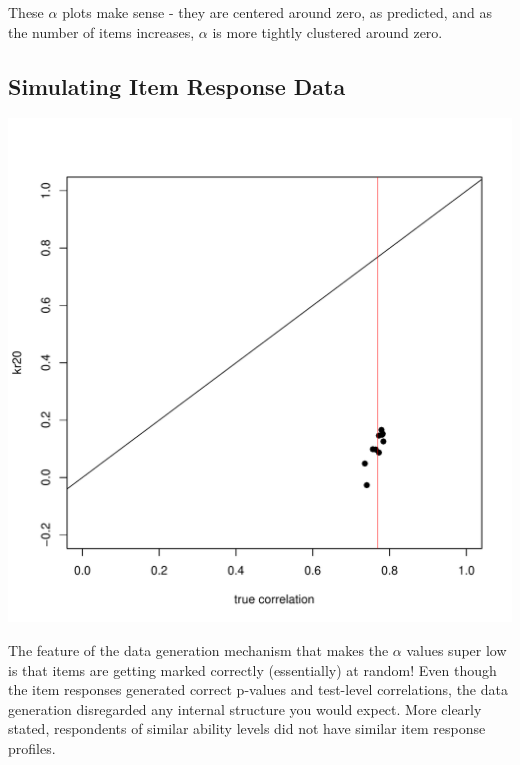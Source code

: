 \documentclass{article}\usepackage[]{graphicx}\usepackage[]{color}
\makeatletter
\def\maxwidth{ %
  \ifdim\Gin@nat@width>\linewidth
    \linewidth
  \else
    \Gin@nat@width
  \fi
}
\newenvironment{knitrout}{}{} %
\makeatother
\begin{document}
    These $\alpha$ plots make sense - they are centered around zero, as predicted, and as the number of items increases, $\alpha$ is more tightly clustered around zero.
\pagebreak
  \subsection{Simulating Item Response Data}

\begin{knitrout}
\color{fgcolor}
\includegraphics[width=\maxwidth]{figure/unnamed-chunk-3-1} 

\end{knitrout}

The feature of the data generation mechanism that makes the $\alpha$ values super low is that items are getting marked correctly (essentially) at random!  Even though the item responses generated correct p-values and test-level correlations, the data generation disregarded any internal structure you would expect.  More clearly stated, respondents of similar ability levels did not have similar item response profiles.
\end{document}
